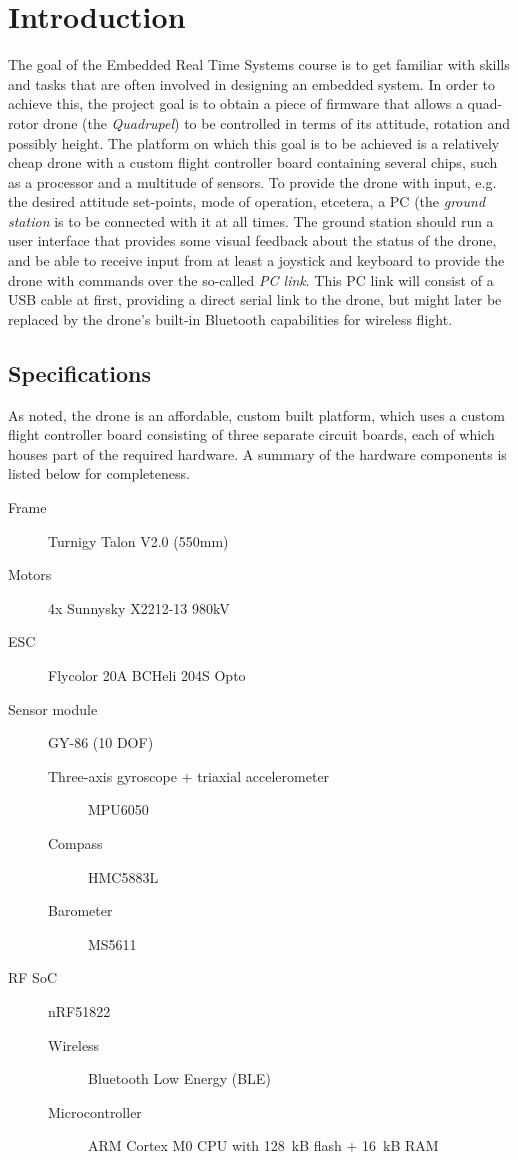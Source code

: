 \documentclass[final]{article}
\begin{document}
\section{Introduction}
The goal of the Embedded Real Time Systems course is to get familiar with skills and tasks that are often involved in designing an embedded system.
In order to achieve this, the project goal is to obtain a piece of firmware that allows a quad-rotor drone (the \emph{Quadrupel}) to be controlled in terms of its attitude, rotation and possibly height.
The platform on which this goal is to be achieved is a relatively cheap drone with a custom flight controller board containing several chips, such as a processor and a multitude of sensors.
To provide the drone with input, e.g. the desired attitude set-points, mode of operation, etcetera, a PC (the \emph{ground station} is to be connected with it at all times.
The ground station should run a user interface that provides some visual feedback about the status of the drone, and be able to receive input from at least a joystick and keyboard to provide the drone with commands over the so-called \emph{PC link}.
This PC link will consist of a USB cable at first, providing a direct serial link to the drone, but might later be replaced by the drone's built-in Bluetooth capabilities for wireless flight.

\subsection{Specifications}
As noted, the drone is an affordable, custom built platform, which uses a custom flight controller board consisting of three separate circuit boards, each of which houses part of the required hardware.
A summary of the hardware components is listed below for completeness.

\begin{description}
	\item[Frame] Turnigy Talon V2.0 (550mm)
	\item[Motors] 4x Sunnysky X2212-13 980kV
	\item[ESC] Flycolor 20A BCHeli 204S Opto
	\item[Sensor module] GY-86 (10 DOF)
	\begin{description}
	  	\item[Three-axis gyroscope + triaxial accelerometer] MPU6050
	  	\item[Compass] HMC5883L
	  	\item[Barometer] MS5611
	\end{description}
	\item[RF SoC] nRF51822
	\begin{description}
		\item[Wireless] Bluetooth Low Energy (BLE)
		\item[Microcontroller] ARM Cortex M0 CPU with \SI{128}{kB} flash + \SI{16}{kB} RAM
	\end{description}
\end{description}
\end{document}
